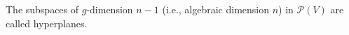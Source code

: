The subspaces of $g$-dimension $n-1$ (i.e., algebraic dimension $n$) in $\mathcal{P}(V)$ are called hyperplanes.
